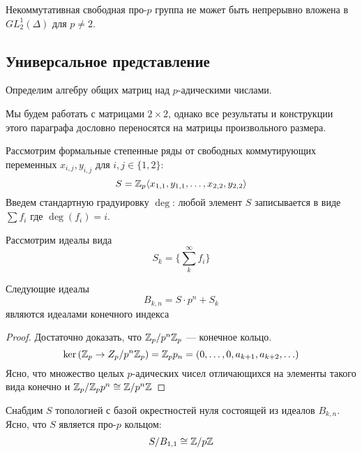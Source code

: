     \begin{theorem}[Зубков, 1989]
        \label{thm:Zubkov-main}
        Некоммутативная свободная про-$p$ группа не может быть непрерывно вложена в $GL^1_2(\Delta)$ для $p\neq 2$.
    \end{theorem}

    \subsection{Универсальное представление}\label{subsec:zubkov-universal}
Определим алгебру общих матриц над $p$-адическими числами.

    Мы будем работать с матрицами $2\times2$, однако все результаты и конструкции этого параграфа дословно переносятся на матрицы произвольного размера.

    Рассмотрим формальные степенные ряды от свободных коммутирующих переменных $x_{i,j}, y_{i,j}$ для $i,j \in \{ 1, 2 \}$:
    \[
        S = \mathbb{Z}_{p}\langle x_{1,1}, y_{1,1}, \ldots, x_{2,2}, y_{2,2} \rangle
    \]
    Введем стандартную градуировку $\deg$: любой элемент $S$ записывается в виде $\sum f_i$ где $\deg{(f_i)} = i$.

    Рассмотрим идеалы вида
    \[
        S_k = \{\sum\limits_k^{\infty} f_i \}
    \]

    \vskip 0.1in\noindent
    \begin{proposition}
        Следующие идеалы
        \[B_{k,n} = S \cdot p^n + S_k \]
        являются идеалами конечного индекса
    \end{proposition}
    \begin{proof}
        Достаточно доказать, что $\mathbb{Z}_p / p^n\mathbb{Z}_p$ --- конечное кольцо.
        \[
            \ker{(\ensuremath{\mathbb{Z}}_p \to Z_p / p^n\ensuremath{\mathbb{Z}}_p )} = \mathbb{Z}_p p_n = \left( 0,\ldots, 0, a_{k+1}, a_{k+2}, \ldots \right)
        \]
        Ясно, что множество целых $p$-адических чисел отличающихся на элементы такого вида конечно и
        $\mathbb{Z}_p / \mathbb{Z}_p p^n \cong \mathbb{Z} / p^n\mathbb{Z}$
    \end{proof}

    Снабдим $S$ топологией с базой окрестностей нуля состоящей из идеалов $B_{k,n}$.
    Ясно, что $S$ является про-$p$ кольцом:
    \[
        S / B_{1,1} \cong \mathbb{Z}/p\mathbb{Z}
    \]

